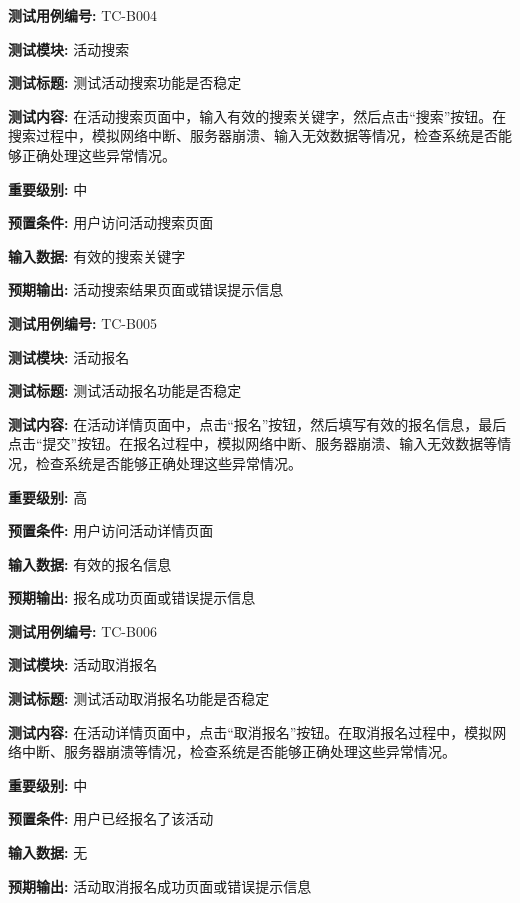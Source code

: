 \begin{framed} \textbf{测试用例编号:} TC-B004

\textbf{测试模块:} 活动搜索

\textbf{测试标题:} 测试活动搜索功能是否稳定

\textbf{测试内容:} 在活动搜索页面中，输入有效的搜索关键字，然后点击“搜索”按钮。在搜索过程中，模拟网络中断、服务器崩溃、输入无效数据等情况，检查系统是否能够正确处理这些异常情况。

\textbf{重要级别:} 中

\textbf{预置条件:} 用户访问活动搜索页面

\textbf{输入数据:} 有效的搜索关键字

\textbf{预期输出:} 活动搜索结果页面或错误提示信息

\begin{center}  \end{center} \end{framed}
\begin{framed} \textbf{测试用例编号:} TC-B005

\textbf{测试模块:} 活动报名

\textbf{测试标题:} 测试活动报名功能是否稳定

\textbf{测试内容:} 在活动详情页面中，点击“报名”按钮，然后填写有效的报名信息，最后点击“提交”按钮。在报名过程中，模拟网络中断、服务器崩溃、输入无效数据等情况，检查系统是否能够正确处理这些异常情况。

\textbf{重要级别:} 高

\textbf{预置条件:} 用户访问活动详情页面

\textbf{输入数据:} 有效的报名信息

\textbf{预期输出:} 报名成功页面或错误提示信息

\begin{center}  \end{center} \end{framed}

\begin{framed} \textbf{测试用例编号:} TC-B006

\textbf{测试模块:} 活动取消报名

\textbf{测试标题:} 测试活动取消报名功能是否稳定

\textbf{测试内容:} 在活动详情页面中，点击“取消报名”按钮。在取消报名过程中，模拟网络中断、服务器崩溃等情况，检查系统是否能够正确处理这些异常情况。

\textbf{重要级别:} 中

\textbf{预置条件:} 用户已经报名了该活动

\textbf{输入数据:} 无

\textbf{预期输出:} 活动取消报名成功页面或错误提示信息

\begin{center}  \end{center} \end{framed}

